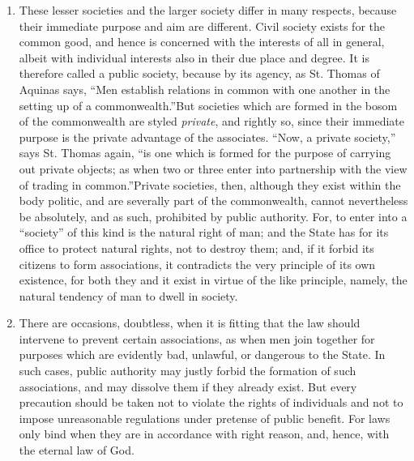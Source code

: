 \documentclass{book}
\begin{document}
\begin{enumerate}
	\item These lesser societies and the larger society differ in many respects, because their immediate purpose and aim are different. Civil society exists for the common good, and hence is concerned with the interests of all in general, albeit with individual interests also in their due place and degree. It is therefore called a public society, because by its agency, as St. Thomas of Aquinas says, “Men establish relations in common with one another in the setting up of a commonwealth.”\footnotemark[34] But societies which are formed in the bosom of the commonwealth are styled \emph{private}, and rightly so, since their immediate purpose is the private advantage of the associates. “Now, a private society,” says St. Thomas again, “is one which is formed for the purpose of carrying out private objects; as when two or three enter into partnership with the view of trading in common.”\footnotemark[35] Private societies, then, although they exist within the body politic, and are severally part of the commonwealth, cannot nevertheless be absolutely, and as such, prohibited by public authority. For, to enter into a “society” of this kind is the natural right of man; and the State has for its office to protect natural rights, not to destroy them; and, if it forbid its citizens to form associations, it contradicts the very principle of its own existence, for both they and it exist in virtue of the like principle, namely, the natural tendency of man to dwell in society.


	\item There are occasions, doubtless, when it is fitting that the law should intervene to prevent certain associations, as when men join together for purposes which are evidently bad, unlawful, or dangerous to the State. In such cases, public authority may justly forbid the formation of such associations, and may dissolve them if they already exist. But every precaution should be taken not to violate the rights of individuals and not to impose unreasonable regulations under pretense of public benefit. For laws only bind when they are in accordance with right reason, and, hence, with the eternal law of God.\footnotemark[36]



\end{enumerate}
\end{document}
